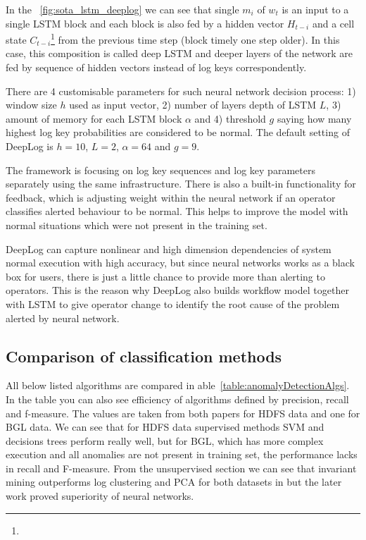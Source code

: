 In the ~\ref{fig:sota_lstm_deeplog} we can see that single $m_{i}$ of $w_{t}$ is an input to a single LSTM block and each block is also fed by a hidden vector $H_{t-i}$ and a cell state $C_{t-i}$\footnote{} from the previous time step (block timely one step older). In this case, this composition is called deep LSTM and deeper layers of the network are fed by sequence of hidden vectors instead of log keys correspondently. 

There are 4 customisable parameters for such neural network  decision process: 1) window size $h$ used as input vector, 2) number of layers\ms{/} depth of LSTM $L$, 3) amount of memory for each LSTM block $\alpha$ and 4) threshold $g$ saying how many highest log key probabilities are considered to be normal. The default setting of DeepLog is $h=10$, $L=2$, $\alpha=64$ and $g=9$. 

The framework is focusing on log key sequences and log key parameters separately using the same infrastructure. There is also a built-in functionality for feedback, which is adjusting weight within the neural network if an operator classifies alerted behaviour to be normal. This helps to improve the model with normal situations which were not present in the training set.

DeepLog can capture nonlinear and high dimension dependencies of system normal execution with high accuracy, but since neural networks works as a black box for users, there is just a little chance to provide more than alerting to operators. This is the reason why DeepLog also builds workflow model together with LSTM to give operator change to identify the root cause of the problem alerted by neural network.

\subsection{Comparison of classification methods}

All below listed algorithms are compared in able~\ref{table:anomalyDetectionAlgs}. In the table you can also see efficiency of algorithms defined by precision, recall and f-measure. The values are taken from both papers for HDFS data and one for BGL data. We can see that for HDFS data supervised methods SVM and decisions trees perform really well, but for BGL, which has more complex execution and all anomalies are not present in training set, the performance lacks in recall and F-measure. From the unsupervised section we can see that invariant mining outperforms log clustering and PCA for both datasets in \cite{he2016experience} but the later work proved superiority of neural networks. 

